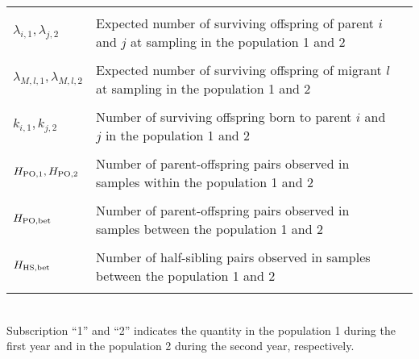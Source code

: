 \documentclass[12pt, English]{article}
\begin{document}
\begin{spacing}{1.9}
\begin{table}[tb]
\begin{tabular}{llc}
					                			& \\
	$\lambda_{i,1}, \lambda_{j,2}$			& Expected number of surviving offspring of parent $i$ and $j$ at sampling in the population 1 and 2\\
		                						& \\
	$\lambda_{M,l,1}, \lambda_{M,l,2}$		& Expected number of surviving offspring of migrant $l$ at sampling in the population 1 and 2\\
		                						& \\
	$k_{i,1}, k_{j,2}$					& Number of surviving offspring born to parent $i$ and $j$ in the population 1 and 2\\ 
	                							& \\
	$H_{\rm PO, 1}, H_{\rm PO, 2}$		& Number of parent-offspring pairs observed in samples within the population 1 and 2\\ 
	                							& \\
	$H_{\rm PO, bet}$					& Number of parent-offspring pairs observed in samples between the population 1 and 2\\ 
	                							& \\
	$H_{\rm HS, bet}$					& Number of half-sibling pairs observed in samples between the population 1 and 2\\ 
	                							& \\              		
	\hline
    \end{tabular}
    \label{symbols} 
\\Subscription ``1'' and ``2'' indicates the quantity in the population 1 during the first year and in the population 2 during the second year, respectively. 
\end{table}
\renewcommand{\arraystretch}{1}

\clearpage


\end{spacing}
\end{document}
